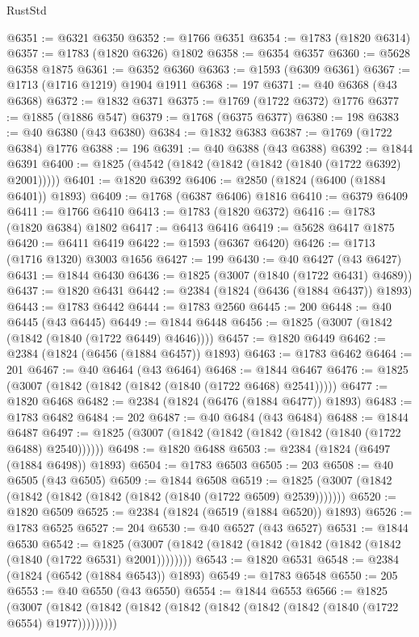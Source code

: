\begin{lexlean}{RustStd}
\begin{coremodule}
{\begin{coremodule}
{{{{{{{{{{{{{{{{{{{{{{{{{{{{{{{{{{{{{{{{{{{{{{{@6351 := @6321 @6350
@6352 := @1766 @6351
@6354 := @1783 (@1820 @6314)
@6357 := @1783 (@1820 @6326) @1802
@6358 := @6354 @6357
@6360 := @5628 @6358 @1875
@6361 := @6352 @6360
@6363 := @1593 (@6309 @6361)
@6367 := @1713 (@1716 @1219) @1904 @1911
@6368 := 197
@6371 := @40 @6368 (@43 @6368)
@6372 := @1832 @6371
@6375 := @1769 (@1722 @6372) @1776
@6377 := @1885 (@1886 @547)
@6379 := @1768 (@6375 @6377)
@6380 := 198
@6383 := @40 @6380 (@43 @6380)
@6384 := @1832 @6383
@6387 := @1769 (@1722 @6384) @1776
@6388 := 196
@6391 := @40 @6388 (@43 @6388)
@6392 := @1844 @6391
@6400 := @1825 (@4542 (@1842 (@1842 (@1842 (@1840 (@1722 @6392) @2001)))))
@6401 := @1820 @6392
@6406 := @2850 (@1824 (@6400 (@1884 @6401)) @1893)
@6409 := @1768 (@6387 @6406) @1816
@6410 := @6379 @6409
@6411 := @1766 @6410
@6413 := @1783 (@1820 @6372)
@6416 := @1783 (@1820 @6384) @1802
@6417 := @6413 @6416
@6419 := @5628 @6417 @1875
@6420 := @6411 @6419
@6422 := @1593 (@6367 @6420)
@6426 := @1713 (@1716 @1320) @3003 @1656
@6427 := 199
@6430 := @40 @6427 (@43 @6427)
@6431 := @1844 @6430
@6436 := @1825 (@3007 (@1840 (@1722 @6431) @4689))
@6437 := @1820 @6431
@6442 := @2384 (@1824 (@6436 (@1884 @6437)) @1893)
@6443 := @1783 @6442
@6444 := @1783 @2560
@6445 := 200
@6448 := @40 @6445 (@43 @6445)
@6449 := @1844 @6448
@6456 := @1825 (@3007 (@1842 (@1842 (@1840 (@1722 @6449) @4646))))
@6457 := @1820 @6449
@6462 := @2384 (@1824 (@6456 (@1884 @6457)) @1893)
@6463 := @1783 @6462
@6464 := 201
@6467 := @40 @6464 (@43 @6464)
@6468 := @1844 @6467
@6476 := @1825 (@3007 (@1842 (@1842 (@1842 (@1840 (@1722 @6468) @2541)))))
@6477 := @1820 @6468
@6482 := @2384 (@1824 (@6476 (@1884 @6477)) @1893)
@6483 := @1783 @6482
@6484 := 202
@6487 := @40 @6484 (@43 @6484)
@6488 := @1844 @6487
@6497 := @1825 (@3007 (@1842 (@1842 (@1842 (@1842 (@1840 (@1722 @6488) @2540))))))
@6498 := @1820 @6488
@6503 := @2384 (@1824 (@6497 (@1884 @6498)) @1893)
@6504 := @1783 @6503
@6505 := 203
@6508 := @40 @6505 (@43 @6505)
@6509 := @1844 @6508
@6519 := @1825 (@3007 (@1842 (@1842 (@1842 (@1842 (@1842 (@1840 (@1722 @6509) @2539)))))))
@6520 := @1820 @6509
@6525 := @2384 (@1824 (@6519 (@1884 @6520)) @1893)
@6526 := @1783 @6525
@6527 := 204
@6530 := @40 @6527 (@43 @6527)
@6531 := @1844 @6530
@6542 := @1825 (@3007 (@1842 (@1842 (@1842 (@1842 (@1842 (@1842 (@1840 (@1722 @6531) @2001))))))))
@6543 := @1820 @6531
@6548 := @2384 (@1824 (@6542 (@1884 @6543)) @1893)
@6549 := @1783 @6548
@6550 := 205
@6553 := @40 @6550 (@43 @6550)
@6554 := @1844 @6553
@6566 := @1825
    (@3007 (@1842 (@1842 (@1842 (@1842 (@1842 (@1842 (@1842 (@1840 (@1722 @6554) @1977)))))))))
}}}}}}}}}}}}}}}}}}}}}}}}}}}}}}}}}}}}}}}}}}}}}}}
\end{coremodule}}
\end{coremodule}
\end{lexlean}
